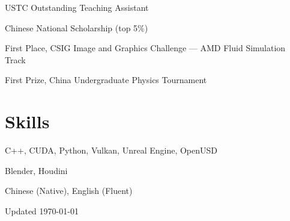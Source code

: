 \documentclass[11pt,a4paper]{article}
\begin{document}
\begin{tablist}
    \item[2024] \tab{}USTC Outstanding Teaching Assistant
    \item[2023] \tab{}Chinese National Scholarship (top 5\%)
    \item[2023] \tab{}First Place, CSIG Image and Graphics Challenge --- AMD Fluid Simulation Track
    \item[2019] \tab{}First Prize, China Undergraduate Physics Tournament
\end{tablist}

\section*{Skills}

\begin{tablist}
    \item[Programming] \tab{}C++, CUDA, Python, Vulkan, Unreal Engine, OpenUSD
    \item[Modelling] \tab{}Blender, Houdini
    \item[Languages] \tab{}Chinese (Native), English (Fluent)
\end{tablist}

\vfill
\begin{center}
    Updated \monthyeardate\today
\end{center}
\end{document}
